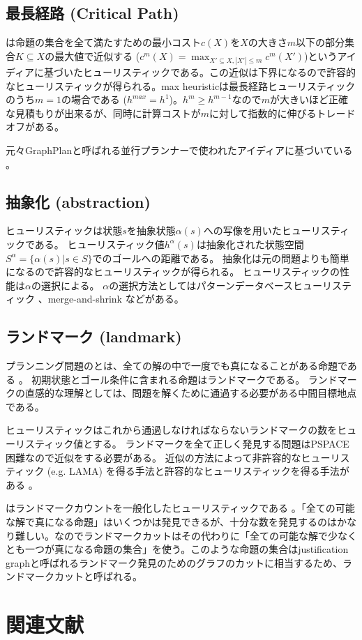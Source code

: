 \subsection{最長経路 (Critical Path)}

 \cite{haslum:00}は命題の集合を全て満たすための最小コスト$c(X)$を$X$の大きさ$m$以下の部分集合$K \subseteq X$の最大値で近似する ($c^m(X) = \max_{X' \subseteq X, |X'| \leq m} c^m(X')$)というアイディアに基づいたヒューリスティックである。この近似は下界になるので許容的なヒューリスティックが得られる。max heuristicは最長経路ヒューリスティックのうち$m=1$の場合である ($h^{max} = h^1$)。$h^m \geq h^{m-1}$なので$m$が大きいほど正確な見積もりが出来るが、同時に計算コストが$m$に対して指数的に伸びるトレードオフがある。

元々GraphPlanと呼ばれる並行プランナーで使われたアイディアに基づいている \cite{blum:97}。

\subsection{抽象化 (abstraction)}

ヒューリスティックは状態$s$を抽象状態$\alpha(s)$への写像を用いたヒューリスティックである。
ヒューリスティック値$h^\alpha(s)$は抽象化された状態空間$S^\alpha = \{\alpha(s) | s \in S\}$でのゴールへの距離である。
抽象化は元の問題よりも簡単になるので許容的なヒューリスティックが得られる。
ヒューリスティックの性能は$\alpha$の選択による。
$\alpha$の選択方法としてはパターンデータベースヒューリスティック \cite{culberson1998pattern,edelkamp2001planning,holte:04,katz2008structural}、merge-and-shrink \cite{helmert2007flexible,helmert2014merge}などがある。


\subsection{ランドマーク (landmark)}

プランニング問題のとは、全ての解の中で一度でも真になることがある命題である \cite{porteous2001extraction}。
初期状態とゴール条件に含まれる命題はランドマークである。
ランドマークの直感的な理解としては、問題を解くために通過する必要がある中間目標地点である。

ヒューリスティックはこれから通過しなければならないランドマークの数をヒューリスティック値とする。
ランドマークを全て正しく発見する問題はPSPACE困難なので近似をする必要がある。
近似の方法によって非許容的なヒューリスティック (e.g. LAMA) \cite{richter2008landmarks}を得る手法と許容的なヒューリスティックを得る手法がある \cite{karpas2009cost}。

はランドマークカウントを一般化したヒューリスティックである \cite{helmert:09}。「全ての可能な解で真になる命題」はいくつかは発見できるが、十分な数を発見するのはかなり難しい。なのでランドマークカットはその代わりに「全ての可能な解で少なくとも一つが真になる命題の集合」を使う。このような命題の集合はjustification graphと呼ばれるランドマーク発見のためのグラフのカットに相当するため、ランドマークカットと呼ばれる。


\section{関連文献}

\TODO{}
